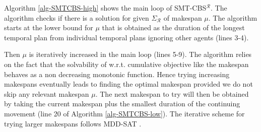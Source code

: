 Algorithm \ref{alg-SMTCBS-high} shows the main loop of SMT-CBS$^\mathcal{R}$. The algorithm checks if there is a solution for given \mapfr $\Sigma_\mathcal{R}$ of makespan $\mu$. The algorithm starts at the lower bound for $\mu$ that is obtained as the duration of the longest temporal plan from individual temporal plans ignoring other agents (lines 3-4).

Then $\mu$ is iteratively increased in the main loop (lines 5-9). The algorithm relies on the fact that the solvability of \mapfr w.r.t. cumulative objective like the makespan behaves as a non decreasing monotonic function. Hence trying increasing makespans eventually leads to finding the optimal makespan provided we do not skip any relevant makespan $\mu$. The next makespan to try will then be obtained by taking the current makespan plus the smallest duration of the continuing movement (line 20 of Algorithm \ref{alg-SMTCBS-low}). The iterative scheme for trying larger makespans follows MDD-SAT \cite{DBLP:conf/ecai/SurynekFSB16}.

